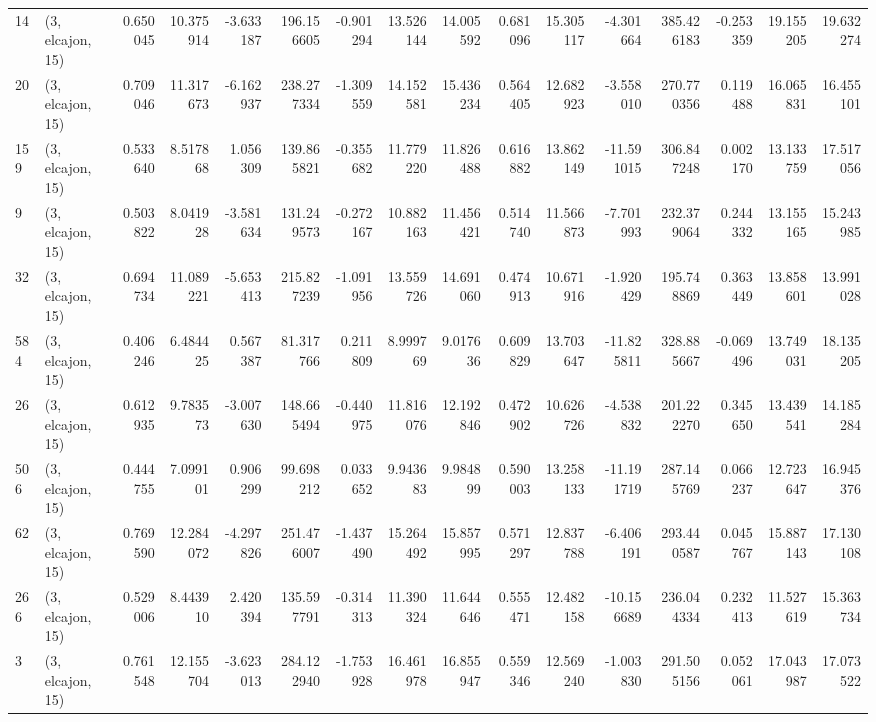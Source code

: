 \begin{tabular}{llrrrrrrrrrrrrrr}
14  &  (3, elcajon, 15) &   0.650045 &  10.375914 &  -3.633187 &   196.156605 &  -0.901294 &  13.526144 &  14.005592 &  0.681096 &  15.305117 &  -4.301664 &   385.426183 & -0.253359 &  19.155205 &  19.632274 \\
20  &  (3, elcajon, 15) &   0.709046 &  11.317673 &  -6.162937 &   238.277334 &  -1.309559 &  14.152581 &  15.436234 &  0.564405 &  12.682923 &  -3.558010 &   270.770356 &  0.119488 &  16.065831 &  16.455101 \\
159 &  (3, elcajon, 15) &   0.533640 &   8.517868 &   1.056309 &   139.865821 &  -0.355682 &  11.779220 &  11.826488 &  0.616882 &  13.862149 & -11.591015 &   306.847248 &  0.002170 &  13.133759 &  17.517056 \\
9   &  (3, elcajon, 15) &   0.503822 &   8.041928 &  -3.581634 &   131.249573 &  -0.272167 &  10.882163 &  11.456421 &  0.514740 &  11.566873 &  -7.701993 &   232.379064 &  0.244332 &  13.155165 &  15.243985 \\
32  &  (3, elcajon, 15) &   0.694734 &  11.089221 &  -5.653413 &   215.827239 &  -1.091956 &  13.559726 &  14.691060 &  0.474913 &  10.671916 &  -1.920429 &   195.748869 &  0.363449 &  13.858601 &  13.991028 \\
584 &  (3, elcajon, 15) &   0.406246 &   6.484425 &   0.567387 &    81.317766 &   0.211809 &   8.999769 &   9.017636 &  0.609829 &  13.703647 & -11.825811 &   328.885667 & -0.069496 &  13.749031 &  18.135205 \\
26  &  (3, elcajon, 15) &   0.612935 &   9.783573 &  -3.007630 &   148.665494 &  -0.440975 &  11.816076 &  12.192846 &  0.472902 &  10.626726 &  -4.538832 &   201.222270 &  0.345650 &  13.439541 &  14.185284 \\
506 &  (3, elcajon, 15) &   0.444755 &   7.099101 &   0.906299 &    99.698212 &   0.033652 &   9.943683 &   9.984899 &  0.590003 &  13.258133 & -11.191719 &   287.145769 &  0.066237 &  12.723647 &  16.945376 \\
62  &  (3, elcajon, 15) &   0.769590 &  12.284072 &  -4.297826 &   251.476007 &  -1.437490 &  15.264492 &  15.857995 &  0.571297 &  12.837788 &  -6.406191 &   293.440587 &  0.045767 &  15.887143 &  17.130108 \\
266 &  (3, elcajon, 15) &   0.529006 &   8.443910 &   2.420394 &   135.597791 &  -0.314313 &  11.390324 &  11.644646 &  0.555471 &  12.482158 & -10.156689 &   236.044334 &  0.232413 &  11.527619 &  15.363734 \\
3   &  (3, elcajon, 15) &   0.761548 &  12.155704 &  -3.623013 &   284.122940 &  -1.753928 &  16.461978 &  16.855947 &  0.559346 &  12.569240 &  -1.003830 &   291.505156 &  0.052061 &  17.043987 &  17.073522 \\

\end{tabular}
